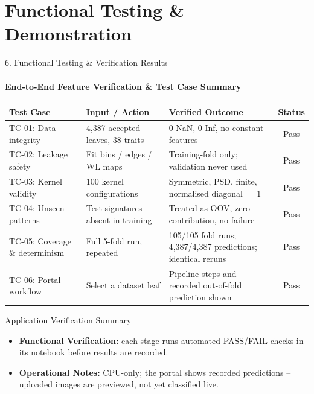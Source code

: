 \documentclass[aspectratio=169, 11pt]{beamer}
\begin{document}
\section{Functional Testing \& Demonstration}

\begin{frame}{6. Functional Testing \& Verification Results}
    \framesubtitle{End-to-End Feature Verification \& Test Case Summary}
    \begin{table}
        \centering
        \scriptsize
        \renewcommand{\arraystretch}{1.05}
        \begin{tabular}{L{3.4cm} L{4.0cm} L{5.4cm} c}
            \toprule
            \textbf{Test Case} & \textbf{Input / Action} & \textbf{Verified Outcome} & \textbf{Status} \\
            \midrule
            TC-01: Data integrity & 4,387 accepted leaves, 38 traits & 0 NaN, 0 Inf, no constant features & Pass \\
            TC-02: Leakage safety & Fit bins / edges / WL maps & Training-fold only; validation never used & Pass \\
            TC-03: Kernel validity & 100 kernel configurations & Symmetric, PSD, finite, normalised diagonal $= 1$ & Pass \\
            TC-04: Unseen patterns & Test signatures absent in training & Treated as OOV, zero contribution, no failure & Pass \\
            TC-05: Coverage \& determinism & Full 5-fold run, repeated & 105/105 fold runs; 4,387/4,387 predictions; identical reruns & Pass \\
            TC-06: Portal workflow & Select a dataset leaf & Pipeline steps and recorded out-of-fold prediction shown & Pass \\
            \bottomrule
        \end{tabular}
    \end{table}

    \begin{block}{Application Verification Summary}
        \scriptsize
        \begin{itemize}
            \item \textbf{Functional Verification:} each stage runs automated PASS/FAIL checks in its notebook before results are recorded.
            \item \textbf{Operational Notes:} CPU-only; the portal shows recorded predictions -- uploaded images are previewed, not yet classified live.
        \end{itemize}
    \end{block}
\end{frame}
\end{document}
